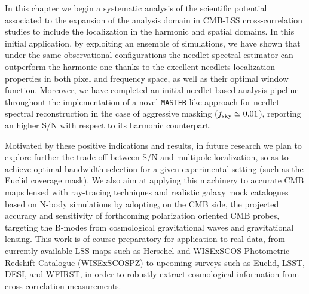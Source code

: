 In this chapter we begin a systematic analysis of the scientific potential associated to the expansion of the analysis domain in CMB-LSS cross-correlation studies to include the localization in the harmonic and spatial domains. In this initial application, by exploiting an ensemble of 
simulations, we have shown that under the same observational configurations the needlet spectral
estimator can outperform the harmonic one thanks to the excellent needlets localization properties in both
pixel and frequency space, as well as their optimal window function. 
Moreover, we have completed an initial needlet based analysis pipeline throughout the implementation of a novel \texttt{MASTER}-like approach for needlet spectral reconstruction in the case of aggressive masking 
($f_{\rm{sky}}\simeq 0.01$), reporting an higher S/N with respect to its harmonic counterpart.

Motivated by these positive indications and results, in future research we plan to explore further the 
trade-off between S/N and multipole 
localization, so as to achieve optimal bandwidth selection for a given experimental setting (such as the 
Euclid coverage mask). We also aim at applying this machinery to accurate CMB maps lensed 
with ray-tracing techniques \citep{Calabrese2015} and realistic galaxy mock catalogues based on N-body 
simulations by adopting, on the CMB side, the projected accuracy and sensitivity of forthcoming polarization oriented CMB probes, targeting the B-modes from cosmological gravitational waves and gravitational lensing. 
This work is of course preparatory for application to real data, from currently available LSS 
maps such as Herschel and WISExSCOS Photometric Redshift Catalogue (WISExSCOSPZ) 
\citep{Bilicki2016} to upcoming surveys such as Euclid, LSST, DESI, and WFIRST, in order to robustly 
extract cosmological information from cross-correlation measurements.


